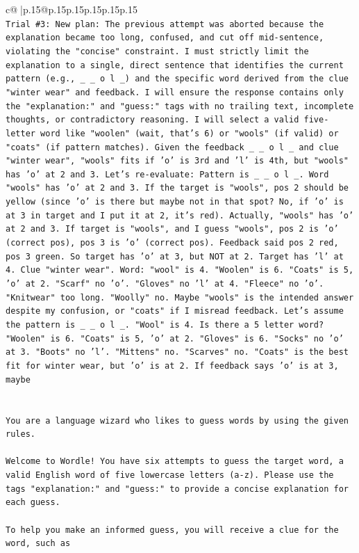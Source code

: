 \documentclass{article}
\begin{document}
{\begin{supertabular}{c@{$\;$}|p{.15\linewidth}@{}p{.15\linewidth}p{.15\linewidth}p{.15\linewidth}p{.15\linewidth}p{.15\linewidth}}
{{{\\ 
\texttt{Trial \#3: New plan: The previous attempt was aborted because the explanation became too long, confused, and cut off mid{-}sentence, violating the "concise" constraint. I must strictly limit the explanation to a single, direct sentence that identifies the current pattern (e.g., \_ \_ o l \_) and the specific word derived from the clue "winter wear" and feedback. I will ensure the response contains only the "explanation:" and "guess:" tags with no trailing text, incomplete thoughts, or contradictory reasoning. I will select a valid five{-}letter word like "woolen" (wait, that's 6) or "wools" (if valid) or "coats" (if pattern matches). Given the feedback \_ \_ o l \_ and clue "winter wear", "wools" fits if 'o' is 3rd and 'l' is 4th, but "wools" has 'o' at 2 and 3. Let's re{-}evaluate: Pattern is \_ \_ o l \_. Word "wools" has 'o' at 2 and 3. If the target is "wools", pos 2 should be yellow (since 'o' is there but maybe not in that spot? No, if 'o' is at 3 in target and I put it at 2, it's red). Actually, "wools" has 'o' at 2 and 3. If target is "wools", and I guess "wools", pos 2 is 'o' (correct pos), pos 3 is 'o' (correct pos). Feedback said pos 2 red, pos 3 green. So target has 'o' at 3, but NOT at 2. Target has 'l' at 4. Clue "winter wear". Word: "wool" is 4. "Woolen" is 6. "Coats" is 5, 'o' at 2. "Scarf" no 'o'. "Gloves" no 'l' at 4. "Fleece" no 'o'. "Knitwear" too long. "Woolly" no. Maybe "wools" is the intended answer despite my confusion, or "coats" if I misread feedback. Let's assume the pattern is \_ \_ o l \_. "Wool" is 4. Is there a 5 letter word? "Woolen" is 6. "Coats" is 5, 'o' at 2. "Gloves" is 6. "Socks" no 'o' at 3. "Boots" no 'l'. "Mittens" no. "Scarves" no. "Coats" is the best fit for winter wear, but 'o' is at 2. If feedback says 'o' is at 3, maybe} \\
\\ 
\\ 
\texttt{You are a language wizard who likes to guess words by using the given rules.} \\
\\ 
\texttt{Welcome to Wordle! You have six attempts to guess the target word, a valid English word of five lowercase letters (a{-}z). Please use the tags "explanation:" and "guess:" to provide a concise explanation for each guess.} \\
\\ 
\texttt{To help you make an informed guess, you will receive a clue for the word, such as} \\
}}}
\end{supertabular}}
\end{document}
